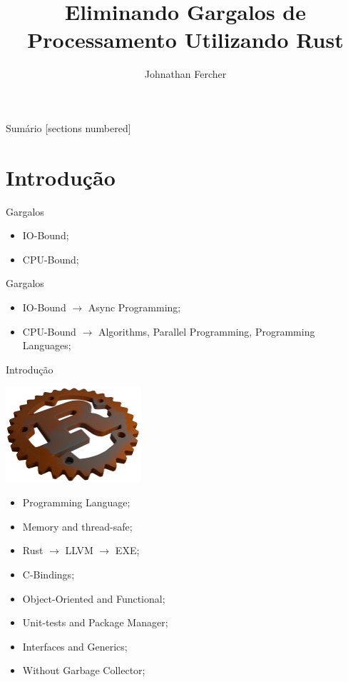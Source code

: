 \documentclass[aspectratio=169]{beamer}
\title{Eliminando Gargalos de Processamento \newline Utilizando Rust}
\date{}
\author{Johnathan Fercher}
\begin{document}
\maketitle

\begin{frame}{Sumário}
  [sections numbered]
  \tableofcontents[hideallsubsections]
\end{frame}

\section{Introdução}
\begin{frame}{Gargalos}		
	\begin{itemize}
		\item IO-Bound;
		\item CPU-Bound;
	\end{itemize}	
\end{frame}

\begin{frame}{Gargalos}		
\begin{itemize}
	\item IO-Bound $\rightarrow$ Async Programming;
	\item CPU-Bound $\rightarrow$ Algorithms, Parallel Programming, Programming Languages;
\end{itemize}	
\end{frame}

\begin{frame}{Introdução}
	\begin{multicols}{2}		
		\begin{center}
			\includegraphics[width=5cm]{imgs/rust3d.png}
		\end{center}
		\footnotesize
		\begin{itemize}
			\item Programming Language;
			\item Memory and thread-safe;
			\item Rust $\rightarrow$ LLVM $\rightarrow$ EXE;
			\item C-Bindings;
			\item Object-Oriented and Functional;
			\item Unit-tests and Package Manager;
			\item Interfaces and Generics;
			\item Without Garbage Collector;
		\end{itemize}	
	\end{multicols}
\end{frame}
\end{document}
